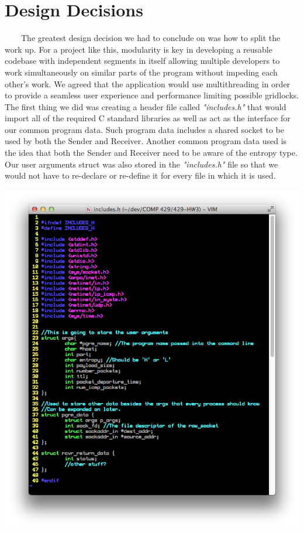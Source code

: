 \documentclass[11pt]{article}
\begin{document}
\section{Design Decisions}
\ \ \ \ The greatest design decision we had to conclude on was how to split the work up. For a project like this, modularity is key in developing a reusable codebase with independent segments in itself allowing multiple developers to work simultaneously on similar parts of the program without impeding each other's work. We agreed that the application would use multithreading in order to provide a seamless user experience and performance limiting possible gridlocks. The first thing we did was creating a header file called \textit{"includes.h"} that would import all of the required C standard libraries as well as act as the interface for our common program data. Such program data includes a shared socket to be used by both the Sender and Receiver. Another common program data used is the idea that both the Sender and Receiver need to be aware of the entropy type.  Our user arguments struct was also stored in the \textit{"includes.h"} file so that we would not have to re-declare or re-define it for every file in which it is used.
\begin{center}
\includegraphics[scale=0.4]{images/includes-header.png}
\end{center}
\end{document}
